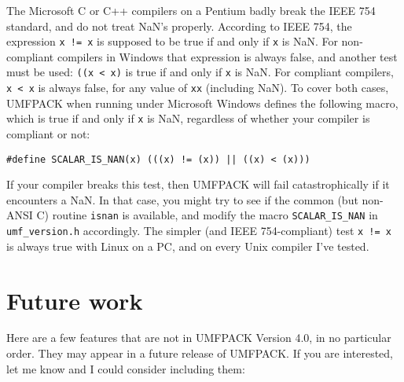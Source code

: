 The Microsoft C or C++ compilers on a Pentium badly break the IEEE 754 standard,
and do not treat NaN's properly.  According to IEEE 754, the expression
{\tt x != x} is supposed to be true if and only if {\tt x} is NaN.  For
non-compliant compilers in Windows that expression is always false, and another
test must be used: {\tt ((x < x)} is true if and only if {\tt x}
is NaN.  For compliant compilers, {\tt x < x} is always false, for any
value of {\tt xx} (including NaN).
To cover both cases, UMFPACK when running under Microsoft Windows
defines the following macro, which is true if and only if {\tt x} is NaN,
regardless of whether your compiler is compliant or not:

\begin{verbatim}
#define SCALAR_IS_NAN(x) (((x) != (x)) || ((x) < (x)))
\end{verbatim}

If your compiler breaks this test, then UMFPACK will fail catastrophically
if it encounters a NaN.  In that case, you might try to see if the common
(but non-ANSI C) routine {\tt isnan} is available, and modify the macro
{\tt SCALAR\_IS\_NAN} in {\tt umf\_version.h} accordingly.  The simpler
(and IEEE 754-compliant) test {\tt x != x} is always true with Linux on a PC,
and on every Unix compiler I've tested.

\section{Future work}
\label{Future}

Here are a few features that are not in UMFPACK Version 4.0, in no particular
order.  They may appear in a future release of UMFPACK.  If you are interested,
let me know and I could consider including them:

